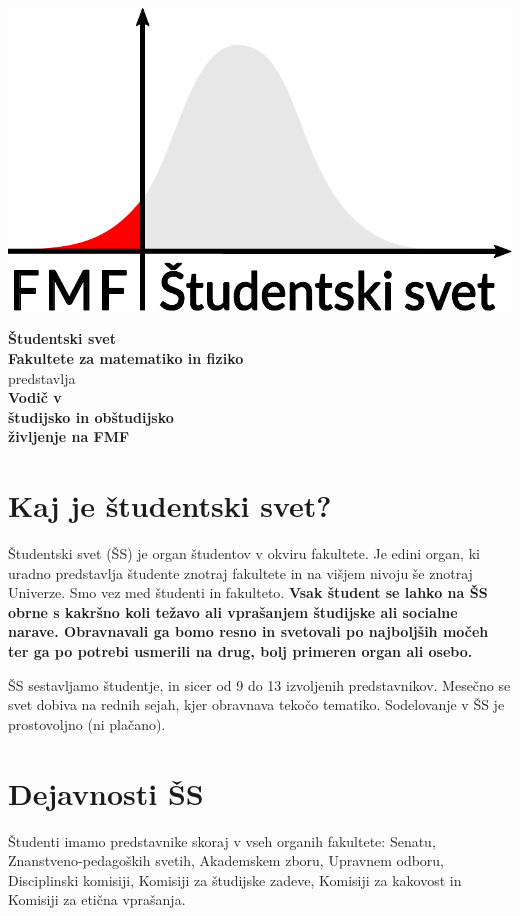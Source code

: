 \documentclass[a4paper,notumble]{leaflet} %
\begin{document}
  \begin{center}
    \includegraphics[width=0.6\linewidth]{ssfmf_logo_col.pdf}
    
    \vfill
    
    \textbf{\Huge Študentski svet} \\[0.2cm]
    \textbf{Fakultete za matematiko in fiziko} \\ [1cm]
    
    predstavlja \\[1cm]
    
    \textbf{\LARGE Vodič v \\[0.2ex] študijsko in obštudijsko \\[1ex]  življenje na FMF}
    
    \vfill
    \vfill
    \vfill
    
    
  \end{center}
  \newpage 
  \section{Kaj je študentski svet?}
  Študentski svet (ŠS) je organ študentov v okviru fakultete. Je edini organ, ki uradno predstavlja študente znotraj fakultete in na višjem nivoju še znotraj Univerze. Smo vez med študenti in fakulteto. \textbf{Vsak študent se lahko na ŠS obrne s kakršno koli težavo ali vprašanjem študijske ali socialne narave. Obravnavali ga bomo resno in svetovali po najboljših močeh ter ga po potrebi usmerili na drug, bolj primeren organ ali osebo.}
  
  ŠS sestavljamo študentje, in sicer od 9 do 13 izvoljenih predstavnikov.
  Mesečno se svet dobiva na rednih sejah, kjer obravnava tekočo tematiko. Sodelovanje v ŠS je prostovoljno (ni plačano).
  
  \vspace{-2ex}
  \section{Dejavnosti ŠS}
  Študenti imamo predstavnike skoraj v vseh organih fakultete:
  Senatu, Znanstveno-pedagoških svetih, Akademskem zboru, 
  Upravnem odboru, Disciplinski komisiji, Komisiji za študijske zadeve, Komisiji za kakovost in Komisiji za etična vprašanja.
  
\end{document}
